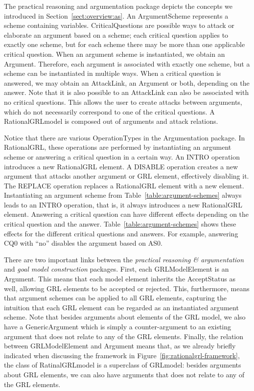 The practical reasoning and argumentation package depicts the concepts we introduced in Section~\ref{sect:overview:as}. An \textsf{ArgumentScheme} represents a scheme containing variables. \textsf{CriticalQuestions} are possible ways to attack or elaborate an argument based on a scheme; each critical question applies to exactly one scheme, but for each scheme there may be more than one applicable critical question. When an argument scheme is instantiated, we obtain an \textsf{Argument}. Therefore, each argument is associated with exactly one scheme, but a scheme can be instantiated in multiple ways. When a critical question is answered, we may obtain an \textsf{AttackLink}, an \textsf{Argument} or both, depending on the answer. Note that it is also possible to an \textsf{AttackLink} can also be associated with no critical questions. This allows the user to create attacks between arguments, which do not necessarily correspond to one of the critical questions. A \textsf{RationalGRLmodel} is composed out of arguments and attack relations.

Notice that there are various \textsf{OperationTypes} in the Argumentation package. In RationalGRL, these operations are performed by instantiating an argument scheme or answering a critical question in a certain way. An \textsf{INTRO} operation introduces a new RationalGRL element. A \textsf{DISABLE} operation creates a new argument that attacks another argument or GRL element, effectively disabling it. The \textsf{REPLACE} operation replaces a RationalGRL element with a new element. Instantiating an argument scheme from Table~\ref{table:argument-schemes} always leads to an \textsf{INTRO} operation, that is, it always introduces a new RationalGRL element. Answering a critical question can have different effects depending on the critical question and the answer. Table~\ref{table:argument-schemes} shows these effects for the different critical questions and answers. For example, answering CQ0 with ``no'' disables the argument based on AS0. 

There are two important links between the \emph{practical reasoning \& argumentation} and \emph{goal model construction} packages. First, each \textsf{GRLModelElement} is an \textsf{Argument}. This means that each model element inherits the \textsf{AcceptStatus} as well, allowing GRL elements to be accepted or rejected. This, furthermore, means that argument schemes can be applied to all GRL elements, capturing the intuition that each GRL element can be regarded as an instantiated argument scheme. Note that besides arguments about elements of the GRL model, we also have a \textsf{GenericArgument} which is simply a counter-argument to an existing argument that does not relate to any of the GRL elements. Finally, the relation between \textsf{GRLModelElement} and \textsf{Argument} means that, as we already briefly indicated when discussing the framework in Figure~\ref{fig:rationalgrl-framework}, the class of \textsf{RatinalGRLmodel} is a superclass of \textsf{GRLmodel}: besides arguments about GRL elements, we can also have arguments that does not relate to any of the GRL elements.

